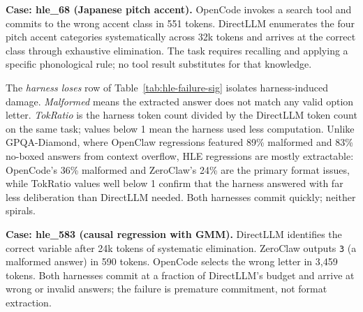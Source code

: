 \textbf{Case: hle\_68 (Japanese pitch accent).}
OpenCode invokes a search tool and commits to the wrong accent class in 551
tokens.
DirectLLM enumerates the four pitch accent categories systematically across
32k tokens and arrives at the correct class through exhaustive elimination.
The task requires recalling and applying a specific phonological rule; no
tool result substitutes for that knowledge.


The \emph{harness loses} row of Table~\ref{tab:hle-failure-sig} isolates
harness-induced damage.
\emph{Malformed} means the extracted answer does not match any valid option
letter.
\emph{TokRatio} is the harness token count divided by the DirectLLM token
count on the same task; values below 1 mean the harness used less computation.
Unlike GPQA-Diamond, where OpenClaw regressions featured 89\% malformed and
83\% no-boxed answers from context overflow, HLE regressions are mostly
extractable: OpenCode's 36\% malformed and ZeroClaw's 24\% are the primary
format issues, while TokRatio values well below 1 confirm that the harness
answered with far less deliberation than DirectLLM needed.
Both harnesses commit quickly; neither spirals.

\textbf{Case: hle\_583 (causal regression with GMM).}
DirectLLM identifies the correct variable after 24k tokens of systematic
elimination.
ZeroClaw outputs \texttt{3} (a malformed answer) in 590 tokens.
OpenCode selects the wrong letter in 3,459 tokens.
Both harnesses commit at a fraction of DirectLLM's budget and arrive at
wrong or invalid answers; the failure is premature commitment, not format
extraction.

